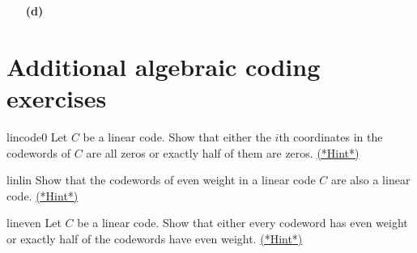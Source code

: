 \begin{exercise}{}
\begin{minipage}[t]{4.6in}
\begin{minipage}[t]{2.25in}
\begin{itemize}
\end{itemize}
\end{minipage} \hfill
\begin{minipage}[t]{2.25in}
\begin{itemize}
 
 \item[{\bf (d)}]
 
\end{itemize}
\end{minipage}
\end{minipage}
 
\end{exercise}
 

\section{Additional algebraic coding exercises}
\label{sec:ErrorAndCorrectionCode:AdditionalCodingExercises}
 

\begin{exercise}{lincode0}  
Let $C$ be a linear code. Show that either the $i$th coordinates in the
codewords of $C$ are all zeros or exactly half of them are zeros. \hyperref[sec:algcodes:hints]{(*Hint*)}
\end{exercise} 

\begin{exercise}{linlin}
Show that the codewords of even weight in a linear code $C$ are also a
linear code.  \hyperref[sec:algcodes:hints]{(*Hint*)}
\end{exercise}	 


\begin{exercise}{lineven}
Let $C$ be a linear code. Show that either every codeword has even
weight or exactly half of the codewords have even weight.  \hyperref[sec:algcodes:hints]{(*Hint*)}
\end{exercise} 
 
